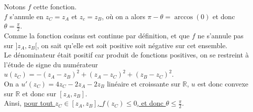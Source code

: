 \documentclass{article}
\begin{document}
Notons $f$ cette fonction.\\
$f$ s'annule en $z_C = z_A$ et $z_c = z_B$, où on a alors $\pi - \theta = \arccos(0)$ et donc $\theta = \frac{\pi}{2}$.\\
Comme la fonction cosinus est continue par définition, et que $f$ ne s'annule pas sur $]z_A, z_B[$, on sait qu'elle est soit positive soit négative sur cet ensemble.\\
Le dénominateur était positif car produit de fonctions positives, on se restreint à l'étude de signe du numérateur $u(z_C) = -(z_A - z_B)^2 + (z_A - z_C)^2 + (z_B- z_C)^2$.\\
On a $u'(z_C) = 4z_C - 2z_A - 2z_B$ linéaire et croissante sur $\mathbb{R}$, $u$ est donc convexe sur $\mathbb{R}$ et donc sur $[z_A, z_B]$.\\
Ainsi, \underline{pour tout $z_C \in [z_A, z_B]$, $f(z_C) \leq 0$, et donc $\theta \leq \frac{\pi}{2}$}.
\end{document}
